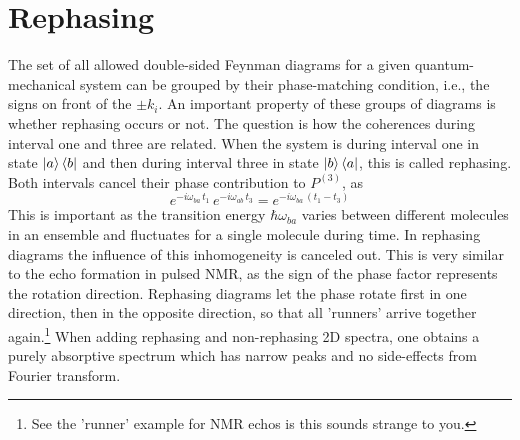 \section{Rephasing}

The set of all allowed double-sided Feynman diagrams for a given quantum-mechanical system can be grouped by their phase-matching condition, i.e., the signs on front of the $\pm k_i$. An important property of these groups of diagrams is whether rephasing occurs or not. The question is how the coherences during interval one and three are related. When the system is during interval one in state $\ket{a}\bra{b}$  and then during interval three in state $\ket{b}\bra{a}$, this is called rephasing. Both intervals cancel their phase contribution to $P^{(3)}$, as
\begin{equation}
  e^{- i \omega_{ba} \, t_1} \,   e^{- i \omega_{ab} \, t_3} =   e^{- i  \omega_{ba} \, ( t_1 - t_3)}
\end{equation}
This is important as the transition energy $\hbar \omega_{ba}$ varies between different molecules in an ensemble and fluctuates for a single molecule during time. In rephasing diagrams the influence of this inhomogeneity is canceled out. This is very similar to the echo formation in pulsed NMR, as the sign of the phase factor represents the rotation direction. Rephasing diagrams let the phase rotate first in one direction, then in the opposite direction, so that all 'runners' arrive together again.\footnote{See the 'runner' example for NMR echos is this sounds strange to you.} When adding rephasing and non-rephasing 2D spectra, one obtains a purely absorptive spectrum which has narrow peaks and no side-effects from Fourier transform.



\printbibliography[segment=\therefsegment,heading=subbibliography]
